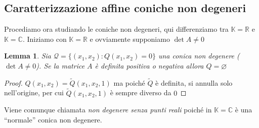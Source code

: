 \documentclass{article}
\newcounter{theo}[section]\setcounter{theo}{0}
\theoremstyle{plain}
\newtheorem{lemma}[theo]{Lemma}
\theoremstyle{definition}
\theoremstyle{remark}
\begin{document}
\subsection{Caratterizzazione affine coniche non degeneri}
Procediamo ora studiando le coniche non degeneri, qui differenziamo tra
\(\mathbb{K} = \mathbb{R}\) e \(\mathbb{K} = \mathbb{C}\). Iniziamo con
\(\mathbb{K} = \mathbb{R}\) e ovviamente supponiamo \(\det A \neq 0\) 
\begin{lemma}
    Sia \(\mathcal{Q} = \{(x_{1}, x_{2}) : Q(x_{1}, x_{2}) = 0\} \) una conica
    non degenere (\(\det A \neq 0\)). Se la matrice \(A\) è definita positiva o
    negativa allora \(Q = \varnothing\) 
\end{lemma}
\begin{proof}
    \(Q(x_{1}, x_{2}) = \widetilde{Q}(x_{1}, x_{2}, 1)\) ma poiché \(\widetilde{Q}\) è
    definita, si annulla solo nell'origine, per cui \(\widetilde{Q}(x_{1}, x_{2},
    1)\) è sempre diverso da \(0\) 
\end{proof}
Viene comunque chiamata \emph{non degenere senza punti reali} poiché in
\(\mathbb{K} = \mathbb{C}\) è una ``normale'' conica non degenere.
\end{document}
